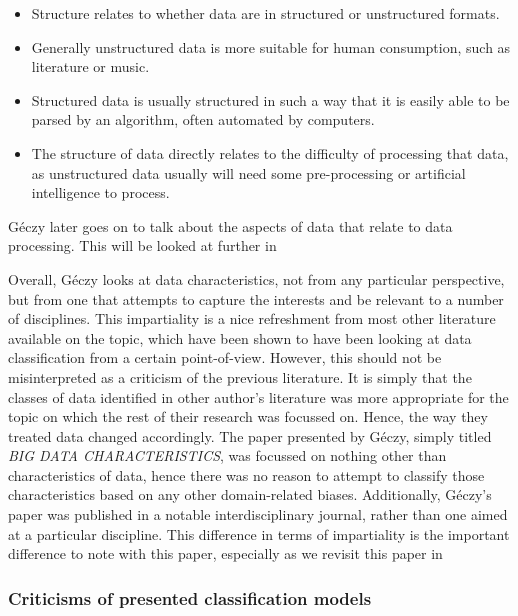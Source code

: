 \documentclass[a4paper,11pt]{article}
\begin{document}
\begin{itemize}
  \item Structure relates to whether data are in structured or unstructured formats.
  \item Generally unstructured data is more suitable for human consumption, such as literature or music.
  \item Structured data is usually structured in such a way that it is easily able to be parsed by an algorithm, often
  automated by computers.
  \item The structure of data directly relates to the difficulty of processing that data, as unstructured data usually
  will need some pre-processing or artificial intelligence to process.
\end{itemize}

G\'eczy later goes on to talk about the aspects of data that relate to data processing. This will be looked at further
in~\sectref{} %

Overall, G\'eczy looks at data characteristics, not from any particular perspective, but from one that attempts to capture
the interests and be relevant to a number of disciplines. This impartiality is a nice refreshment from most other literature
available on the topic, which have been shown to have been looking at data classification from a certain point-of-view.
However, this should not be misinterpreted as a criticism of the previous literature. It is simply that the classes of
data identified in other author's literature was more appropriate for the topic on which the rest of their research was
focussed on. Hence, the way they treated data changed accordingly. The paper presented by G\'eczy, simply titled
\emph{BIG DATA CHARACTERISTICS}, was focussed on nothing other than characteristics of data, hence there was no reason
to attempt to classify those characteristics based on any other domain-related biases. Additionally, G\'eczy's paper was
published in a notable interdisciplinary journal, rather than one aimed at a particular discipline. This difference in
terms of impartiality is the important difference to note with this paper, especially as we revisit this paper in~\sectref{} %



\subsubsection{Criticisms of presented classification models} %
\label{ssub:criticisms_of_previously_presented_models}
\end{document}
